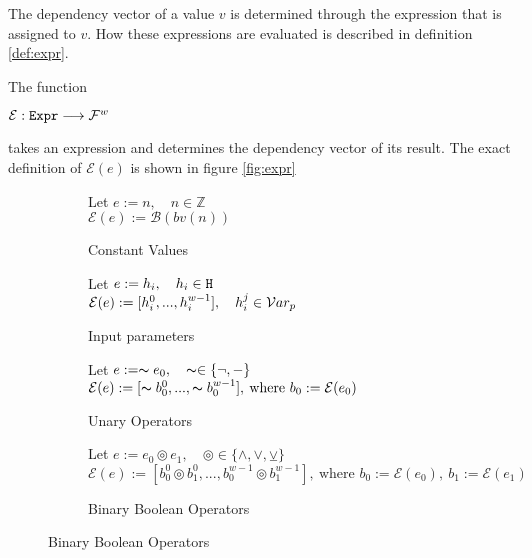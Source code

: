 The dependency vector of a value $v$ is determined through the expression that is assigned to $v$. How these expressions are evaluated is described in definition \ref{def:expr}.

\begin{definition}\label{def:expr}
    The function
    \begin{center}
        $\mathcal{E}: \mathtt{Expr} \longrightarrow \mathcal{F}^w$
    \end{center}
    takes an expression and determines the dependency vector of its result. The exact definition of $\mathcal{E}(e)$ is shown in figure \ref{fig:expr}
\end{definition}

\begin{figure}
    
    \begin{subfigure}{.5\textwidth}
        \caption{Constant Values}
        Let $e := n, \quad n \in \mathbb{Z}$\\
        $\mathcal{E}(e) := \mathcal{B}(bv(n))$
        
    \end{subfigure}

    \begin{subfigure}{.5\textwidth}
        \caption{Input parameters}
        Let $e := h_i, \quad h_i \in \mathtt{H}$\\
        $\mathcal{E}(e) := [h_i^0, ..., h_i^{w-1}], \quad h_i^j \in \mathcal{V}ar_p$
        
    \end{subfigure}

    \begin{subfigure}{1\textwidth}
        \caption{Unary Operators}
        Let $e := \thicksim e_0, \quad \thicksim \in \{ \lnot, - \}$\\
        $\mathcal{E}(e) := [\thicksim b_0^0 , ... , \thicksim b_0^{w-1}], \: \text{where } b_0 := \mathcal{E}(e_0)$
       
    \end{subfigure}

    \begin{subfigure}{1\textwidth}
        \caption{Binary Boolean Operators}
        Let $e := e_0 \circledcirc e_1, \quad \circledcirc \in \{ \land, \lor, \veebar \}$\\
        $\mathcal{E}(e) := [b_0^0 \circledcirc b_1^0, ... , b_0^{w-1} \circledcirc b_1^{w-1}], \: \text{where } b_0 := \mathcal{E}(e_0), \: b_1 := \mathcal{E}(e_1)$
        

\end{subfigure}
\end{figure}
